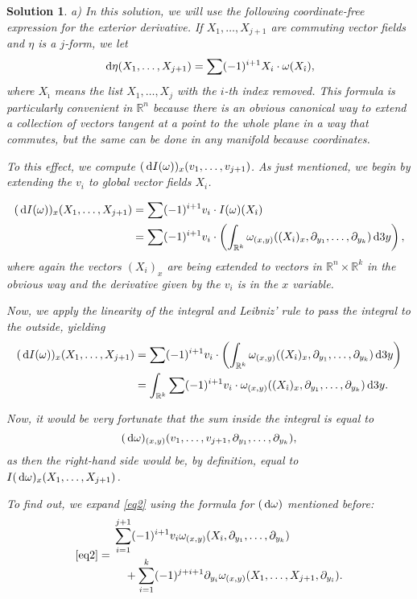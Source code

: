 \documentclass{article}
\theoremstyle{nonumberplain}
\newtheorem{sol}{Solution}
\newcommand{\R}{\mathbb{R}}
\begin{document}
\begin{sol}
a) In this solution, we will use the following coordinate-free expression for the exterior derivative. If $X_1, \dots, X_{j+1}$ are commuting vector fields and $\eta$ is a $j$-form, we let
\[\dl \eta(X_1, \dots, X_{j+1}) = \sum (-1)^{i+1} X_i \cdot \omega(X_{\hat\imath}),\]
where $X_{\hat\imath}$ means the list $X_1, \dots, X_j$ with the $i$-th index removed. This formula is particularly convenient in $\R^n$ because there is an obvious canonical way to extend a collection of vectors tangent at a point to the whole plane in a way that commutes, but the same can be done in any manifold because coordinates.

To this effect, we compute $(\dl I(\omega))_x (v_1, \dots, v_{j+1})$. As just mentioned, we begin by extending the $v_i$ to global vector fields $X_i$.

\begin{align*}
(\dl I(\omega))_x (X_1, \dots, X_{j+1}) &= \sum (-1)^{i+1} v_i \cdot I(\omega)(X_{\hat\imath})\\
&= \sum (-1)^{i+1} v_i \cdot \left( \int_{\R^k} \omega_{(x,y)}((X_{\hat\imath})_x,\partial_{y_1}, \dots, \partial_{y_k}) \dl3 y \right),
\end{align*}
where again the vectors $(X_i)_x$ are being extended to vectors in $\R^n \times \R^k$ in the obvious way and the derivative given by the $v_i$ is in the $x$ variable.

Now, we apply the linearity of the integral and Leibniz' rule to pass the integral to the outside, yielding
\begin{align*}
(\dl I(\omega))_x (X_1, \dots, X_{j+1}) &= \sum (-1)^{i+1} v_i \cdot \left( \int_{\R^k} \omega_{(x,y)}((X_{\hat\imath})_x,\partial_{y_1}, \dots, \partial_{y_k}) \dl3 y \right)\\
&= \int_{\R^k}  \sum (-1)^{i+1} v_i \cdot \omega_{(x,y)}((X_{\hat\imath})_x,\partial_{y_1}, \dots, \partial_{y_k}) \dl3 y.
\end{align*}

Now, it would be very fortunate that the sum inside the integral is equal to
\begin{equation}\label{eq2}
(\dl \omega)_{(x,y)} (v_1, \dots, v_{j+1}, \partial_{y_1}, \dots, \partial_{y_k}),
\end{equation}
as then the right-hand side would be, by definition, equal to $I(\dl \omega)_x(X_1, \dots, X_{j+1})$.

To find out, we expand \eqref{eq2} using the formula for $(\dl \omega)$ mentioned before:
\begin{equation*}
\eqref{eq2} =
\begin{multlined}
\sum_{i=1}^{j+1} (-1)^{i+1} v_i \omega_{(x,y)}(X_{\hat\imath}, \partial_{y_1}, \dots, \partial_{y_k})\\
+ \sum_{i=1}^k (-1)^{j+i+1} \partial_{y_i} \omega_{(x,y)}(X_1, \dots, X_{j+1}, \partial_{y_{\hat\imath}}).
\end{multlined}
\end{equation*}


\end{sol}
\end{document}
